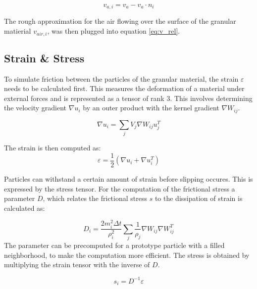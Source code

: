 \documentclass[intern]{cgMA}
\begin{document}
    \begin{equation}
        v_{a, i} = v_{a} - v_{a} \cdot n_i
    \end{equation}

    The rough approximation for the air flowing over the surface of the granular matierial $v_{air, i}$, was then plugged into equation \ref{eq:v_rel}.

    \subsection{Strain \& Stress}
    
    To simulate friction between the particles of the granular material, the strain $\varepsilon$ needs to be calculated first. This measures the deformation of a material under external forces and is represented as a tensor of rank 3. This involves determining the velocity gradient $\nabla u_i$ by an outer product with the kernel gradient $\nabla W_{ij}$. 
    
    \begin{equation}
        \nabla u_i = \sum_j V_j \nabla W_{ij} u_j^T
    \end{equation}

    The strain is then computed as:
    \begin{equation}
        \varepsilon = \frac{1}{2} (\nabla u_i + \nabla u_i^T)
    \end{equation}

    Particles can withstand a certain amount of strain before slipping occures. This is expressed by the stress tensor. For the computation of the frictional stress a parameter $D$, which relates the frictional stress $s$ to the dissipation of strain is calculated as:

    \begin{equation}
        D_i = \frac{2 m_i^2 \Delta t}{\rho_i^2} \sum_j \frac{1}{\rho_j} \nabla W_{ij}  \nabla W_{ij}^T
    \end{equation}
    The parameter can be precomputed for a prototype particle with a filled neighborhood, to make the computation more efficient.
    The stress is obtained by multiplying the strain tensor with the inverse of $D$. 
    
    \begin{equation}
        s_i = D^{-1} \varepsilon
    \end{equation}
\end{document}
